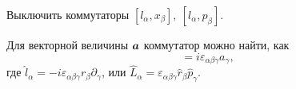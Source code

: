 
\begin{leftrules}
Выключить коммутаторы $[l_\alpha, x_\beta],\ [l_\alpha, p_\beta]$.
\end{leftrules}

Для векторной величины $\mbox{\boldmath $a$}$ коммутатор можно найти, как
\begin{equation*}
    [l_\alpha, a_\beta] = i \varepsilon_{\alpha \beta \gamma} a_\gamma,
\end{equation*}
где $\hat{l}_\alpha = - i \varepsilon_{\alpha \beta \gamma} r_\beta \partial_\gamma$, или $\hat{L}_\alpha = \varepsilon_{\alpha \beta \gamma}  \hat{r}_\beta \hat{p}_\gamma$.

